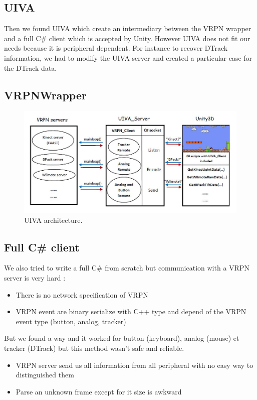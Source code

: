 \documentclass[11pt]{article} %
\begin{document}
\subsection{UIVA}
Then we found UIVA which create an intermediary between the VRPN wrapper and a full C\# client which is accepted by Unity.
However UIVA does not fit our needs because it is peripheral dependent. For instance to recover DTrack information, 
we had to modify the UIVA server and created a particular case for the DTrack data.

\subsection{VRPNWrapper}

\begin{figure}[H]
   \includegraphics[scale=0.7]{UIVA_Framework.JPG}
   \caption{UIVA architecture.}
\end{figure}

\subsection{Full C\# client}

We also tried to write a full C\# from scratch but communication with a VRPN server is very hard :
\begin{itemize}
	\item There is no network specification of VRPN
	\item VRPN event are binary serialize with C++ type and depend of the VRPN event type (button, analog, tracker)
\end{itemize}
But we found a way and it worked for button (keyboard), analog (mouse) et tracker (DTrack) but this method wasn't safe and reliable. 
\begin{itemize}
	\item VRPN server send us all information from all peripheral with no easy way to distinguished them
	\item Parse an unknown frame except for it size is awkward
\end{itemize}
\end{document}
